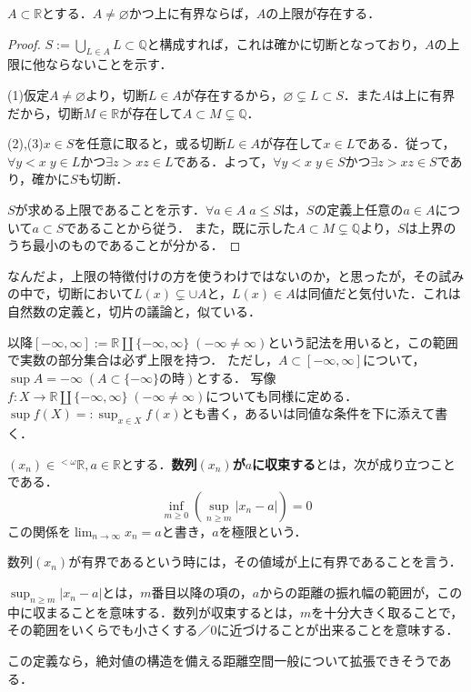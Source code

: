 \documentclass[uplatex, 12pt, dvipdfmx]{jsreport}
\begin{document}
\begin{theorem}[実数の連続性]
    $A\subset\mathbb{R}$とする．$A\ne\varnothing$かつ上に有界ならば，$A$の上限が存在する．
\end{theorem}
\begin{proof}
    $S:=\bigcup_{L\in A}L\subset\mathbb{Q}$と構成すれば，これは確かに切断となっており，$A$の上限に他ならないことを示す．

    (1)仮定$A\ne\varnothing$より，切断$L\in A$が存在するから，$\varnothing\subsetneq L\subset S$．また$A$は上に有界だから，切断$M\in\mathbb{R}$が存在して$A\subset M\subsetneq\mathbb{Q}$．
    
    (2),(3)$x\in S$を任意に取ると，或る切断$L\in A$が存在して$x\in L$である．従って，$\forall y<x\; y\in L$かつ$\exists z>x z\in L$である．よって，$\forall y<x\; y\in S$かつ$\exists z>x z\in S$であり，確かに$S$も切断．

    $S$が求める上限であることを示す．$\forall a\in A\; a\le S$は，$S$の定義上任意の$a\in A$について$a\subset S$であることから従う．
    また，既に示した$A\subset M\subsetneq\mathbb{Q}$より，$S$は上界のうち最小のものであることが分かる．
\end{proof}
\begin{remark}
    なんだよ，上限の特徴付けの方を使うわけではないのか，と思ったが，その試みの中で，切断において$L(x)\subsetneq \cup A$と，$L(x)\in A$は同値だと気付いた．これは自然数の定義と，切片の議論と，似ている．
\end{remark}

以降$[-\infty,\infty]:=\mathbb{R}\coprod\{-\infty,\infty\}\;(-\infty\ne\infty)$という記法を用いると，この範囲で実数の部分集合は必ず上限を持つ．
ただし，$A\subset [-\infty,\infty]$について，$\sup A=-\infty \; (A\subset \{-\infty\}の時)$とする．
写像$f:X\to\mathbb{R}\coprod\{-\infty,\infty\}\;(-\infty\ne\infty)$についても同様に定める．
$\sup f(X)=:\sup_{x\in X}f(x)$とも書く，あるいは同値な条件を下に添えて書く．

\begin{definition}[実数列の収束]
    $(x_n)\in{}^{<\omega}\mathbb{R},a\in\mathbb{R}$とする．\textbf{数列$(x_n)$が$a$に収束する}とは，次が成り立つことである．
    \[ \inf_{m\ge 0}\left(\sup_{n\ge m}|x_n-a|\right)=0 \]
    この関係を$\lim_{n\to\infty}x_n=a$と書き，$a$を極限という．

    数列$(x_n)$が有界であるという時には，その値域が上に有界であることを言う．
\end{definition}
\begin{remark}
    $\sup_{n\ge m}|x_n-a|$とは，$m$番目以降の項の，$a$からの距離の振れ幅の範囲が，この中に収まることを意味する．数列が収束するとは，$m$を十分大きく取ることで，その範囲をいくらでも小さくする／$0$に近づけることが出来ることを意味する．

    この定義なら，絶対値の構造を備える距離空間一般について拡張できそうである．
\end{remark}
\end{document}
